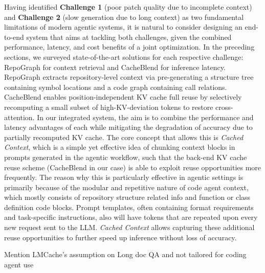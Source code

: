 Having identified \textbf{Challenge 1} (poor patch quality due to incomplete context) and \textbf{Challenge 2} (slow generation due to long context) as two fundamental limitations of modern agentic systems, it is natural to consider designing an end-to-end system that aims at tackling both challenges, given the combined performance, latency, and cost benefits of a joint optimization. In the preceding sections, we surveyed state-of-the-art solutions for each respective challenge: RepoGraph \cite{ouyang2025repographenhancingaisoftware} for context retrieval and CacheBlend \cite{yao2025cacheblendfastlargelanguage} for inference latency. RepoGraph extracts repository-level context via pre-generating a structure tree containing symbol locations and a code graph containing call relations. CacheBlend enables position-independent KV cache full reuse by selectively recomputing a small subset of high-KV-deviation tokens to restore cross-attention. { In our integrated system, the aim is to combine the performance and latency advantages of each while mitigating the degradation of accuracy due to partially recomputed KV cache. The core concept that allows this is \textit{Cached Context}, which is a simple yet effective idea of chunking context blocks in prompts generated in the agentic workflow, such that the back-end KV cache reuse scheme (CacheBlend in our case) is able to exploit reuse opportunities more frequently. The reason why this is particularly effective in agentic settings is primarily because of the modular and repetitive nature of code agent context, which mostly consists of repository structure related info and function or class definition code blocks. Prompt templates, often containing format requirements and task-specific instructions, also will have tokens that are repeated upon every new request sent to the LLM. \textit{Cached Context} allows capturing these additional reuse opportunities to further speed up inference without loss of accuracy.}

 Mention LMCache's assumption on Long doc QA and not tailored for coding agent use